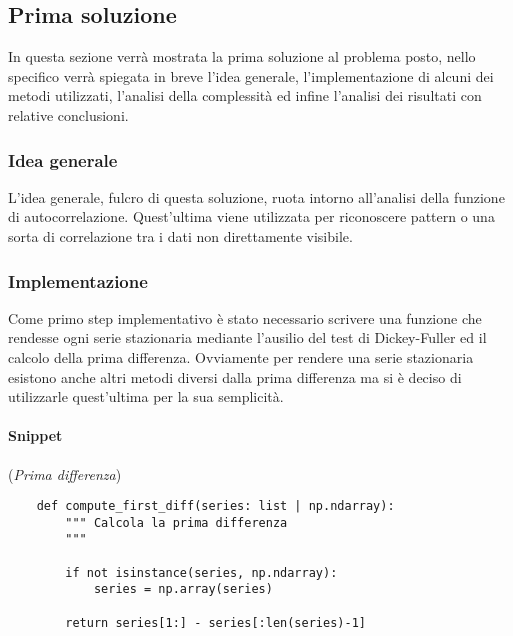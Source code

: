 \subsection{Prima soluzione}
In questa sezione verrà mostrata la prima soluzione al problema posto, nello specifico verrà
spiegata in breve l'idea generale, l'implementazione di alcuni dei metodi utilizzati, 
l'analisi della complessità ed infine l'analisi dei
risultati con relative conclusioni.


\subsubsection{Idea generale}
L'idea generale, fulcro di questa soluzione, ruota intorno all'analisi della funzione di autocorrelazione.
Quest'ultima viene utilizzata per riconoscere pattern o una sorta di correlazione tra i dati non direttamente
visibile.

\subsubsection{Implementazione}
Come primo step implementativo è stato necessario scrivere una funzione che rendesse ogni serie stazionaria 
mediante l'ausilio del test di Dickey-Fuller ed il calcolo della prima differenza. Ovviamente
per rendere una serie stazionaria esistono anche altri metodi diversi dalla prima differenza ma 
si è deciso di utilizzarle quest'ultima per la sua semplicità.

\paragraph*{Snippet} (\textit{Prima differenza})
\begin{verbatim}
    def compute_first_diff(series: list | np.ndarray):
        """ Calcola la prima differenza
        """
        
        if not isinstance(series, np.ndarray):
            series = np.array(series)

        return series[1:] - series[:len(series)-1]
\end{verbatim}

